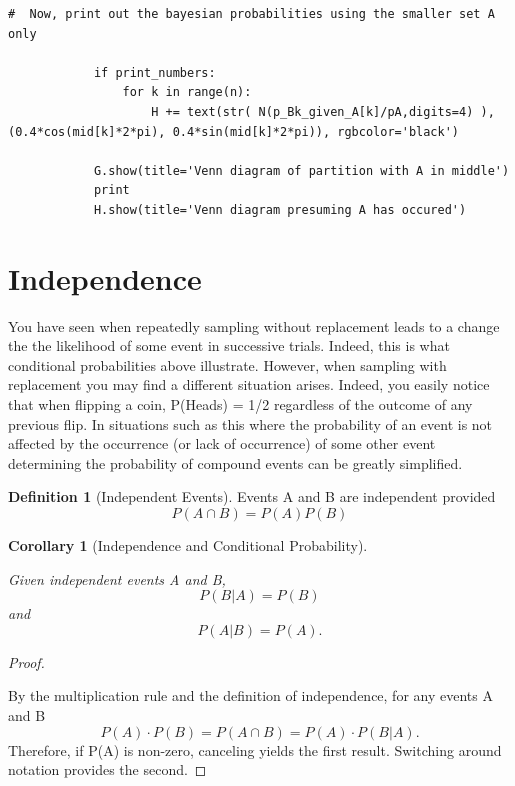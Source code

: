 \documentclass[10pt,]{book}
\theoremstyle{plain}
\newtheorem{corollary}[theorem]{Corollary}
\theoremstyle{definition}
\newtheorem{definition}[theorem]{Definition}
\theoremstyle{definition}
\theoremstyle{definition}
\numberwithin{equation}{section}
\begin{document}
\begin{lstlisting}[style=sageinput]
        #  Now, print out the bayesian probabilities using the smaller set A only
    
            if print_numbers:
                for k in range(n):
                    H += text(str( N(p_Bk_given_A[k]/pA,digits=4) ),(0.4*cos(mid[k]*2*pi), 0.4*sin(mid[k]*2*pi)), rgbcolor='black')
                    
            G.show(title='Venn diagram of partition with A in middle')
            print
            H.show(title='Venn diagram presuming A has occured')
\end{lstlisting}
\typeout{************************************************}
\typeout{************************************************}
\section[{Independence}]{Independence}\label{section-22}
\typeout{************************************************}
\typeout{************************************************}
You have seen when repeatedly sampling without replacement leads to a change the the likelihood of some event in successive trials. Indeed, this is what conditional probabilities above illustrate. However, when sampling with replacement you may find a different situation arises. Indeed, you easily notice that when flipping a coin, P(Heads) = 1/2 regardless of the outcome of any previous flip.  In situations such as this where the probability of an event is not affected by the occurrence (or lack of occurrence) of some other event determining the probability of compound events can be greatly simplified.
\begin{definition}[{Independent Events}]\label{definition-20}
Events A and B are independent provided 
		\begin{equation*}P(A \cap B) = P(A) P(B)\end{equation*}\end{definition}
\begin{corollary}[{Independence and Conditional Probability}]\label{corollary-3}

			Given independent events A and B, 
			\begin{equation*}P(B | A) = P(B)\end{equation*} and \begin{equation*}P(A | B) = P(A).\end{equation*}\end{corollary}
\begin{proof}\hypertarget{proof-19}{}
By the multiplication rule and the definition of independence, for any events A and B
			\begin{equation*}P(A) \cdot P(B) = P(A \cap B) = P(A) \cdot P(B | A) .\end{equation*}
			Therefore, if P(A) is non-zero, canceling yields the first result. Switching around notation provides the second.
\end{proof}
\end{document}
